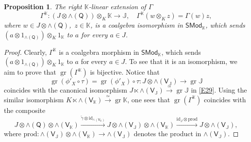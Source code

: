 \documentclass[11pt, a4paper]{amsart}
\newtheorem{prop}[theorem]{Proposition}
\theoremstyle{definition}
\numberwithin{equation}{section}
\begin{document}
\begin{prop}\label{P41}
The right $\mathbb{K}$-linear extension of $\Gamma$
\[ \Gamma^{\mathbb{K}}: (J \otimes \wedge(\mathsf{Q}))\otimes_{K} \mathbb{K} \to \mathbb{J},\quad \Gamma^{\mathbb{K}}(w \otimes_{K} z ) = \Gamma(w)z, \]
where $w \in J \otimes \wedge(\mathsf{Q})$,\ $z \in \mathbb{K}$, is a coalgebra isomorphism in $\mathsf{SMod}_{\mathbb{K}}$, which sends $(a \otimes 1_{\wedge(\mathsf{Q})}) \otimes_{K} 1_{\mathbb{K}}$ to 
$a$ for every $a \in J$.
\end{prop}
\begin{proof}
Clearly, $\Gamma^{\mathbb{K}}$ is a coalgebra morphism in $\mathsf{SMod}_{\mathbb{K}}$, which sends $(a \otimes 1_{\wedge(\mathsf{Q})}) \otimes_{K} 1_{\mathbb{K}}$ to $a$
for every $a \in J$.
To see that it is an isomorphism, we aim to prove that $\operatorname{gr}(\Gamma^{\mathbb{K}})$ is bijective.
Notice that
\[ \operatorname{gr}(\phi'_{X} \circ \tau) = \operatorname{gr}(\phi'_{X}) \circ \tau : J\otimes \wedge(\mathsf{V}_{\mathbb{J}}) \to \operatorname{gr}\mathbb{J}  \]
coincides with the canonical isomorphism
$J \ltimes \wedge(\mathsf{V}_{\mathbb{J}})\overset{\simeq}{\longrightarrow}\operatorname{gr}\mathbb{J}$ 
in \eqref{E29}.
Using the similar isomorphism 
$K \ltimes \wedge(\mathsf{V}_{\mathbb{K}})\overset{\simeq}{\longrightarrow}\operatorname{gr}\mathbb{K}$,
one sees that $\operatorname{gr}(\Gamma^{\mathbb{K}})$ coincides with the composite
\[ J \otimes \wedge(\mathsf{Q}) \otimes \wedge(\mathsf{V}_{\mathbb{K}}) \xrightarrow{\widetilde{\gamma}\otimes \mathrm{id}_{\wedge(\mathsf{V}_{\mathbb{K}})}} J \otimes \wedge(\mathsf{V_{\mathbb{J}}}) \otimes \wedge(\mathsf{V}_{\mathbb{K}}) \xrightarrow{\mathrm{id}_{J} \otimes \mathrm{prod}} J \otimes \wedge(\mathsf{V_{\mathbb{J}}}), \]
where $\mathrm{prod}: \wedge(\mathsf{V}_{\mathbb{J}}) \otimes \wedge(\mathsf{V}_{\mathbb{K}}) \to \wedge(\mathsf{V}_{\mathbb{J}})$ denotes the product in $\wedge(\mathsf{V}_{\mathbb{J}})$.


\end{proof}
\end{document}
